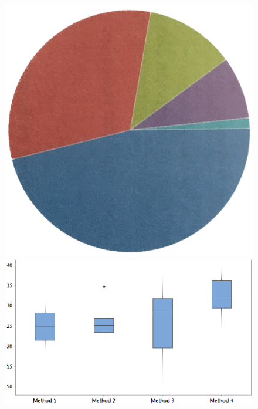 \documentclass[
  letterpaper,
  DIV=11,
  numbers=noendperiod,
  oneside]{scrartcl}
\begin{document}
\begin{figure}
\begin{minipage}{0.25\linewidth}
\end{minipage}%
%
\begin{minipage}{0.25\linewidth}

\includegraphics{www/thumbnail-pie.png}

\end{minipage}%
\newline
\begin{minipage}{0.25\linewidth}

\includegraphics{www/thumbnail-boxplot.png}

\end{minipage}%
%
\begin{minipage}{0.25\linewidth}


\end{minipage}
\end{figure}
\end{document}
